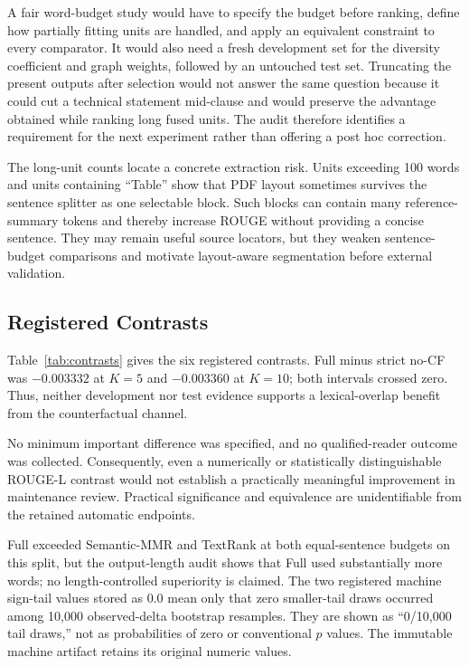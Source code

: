 \documentclass[applsci,article,submit,moreauthors]{Definitions/mdpi}
\begin{document}
A fair word-budget study would have to specify the budget before ranking, define how partially fitting units are handled, and apply an equivalent constraint to every comparator. It would also need a fresh development set for the diversity coefficient and graph weights, followed by an untouched test set. Truncating the present outputs after selection would not answer the same question because it could cut a technical statement mid-clause and would preserve the advantage obtained while ranking long fused units. The audit therefore identifies a requirement for the next experiment rather than offering a post hoc correction.

The long-unit counts locate a concrete extraction risk. Units exceeding 100 words and units containing ``Table'' show that PDF layout sometimes survives the sentence splitter as one selectable block. Such blocks can contain many reference-summary tokens and thereby increase ROUGE without providing a concise sentence. They may remain useful source locators, but they weaken sentence-budget comparisons and motivate layout-aware segmentation before external validation.

\subsection{Registered Contrasts}

Table~\ref{tab:contrasts} gives the six registered contrasts. Full minus strict no-CF was $-0.003332$ at $K=5$ and $-0.003360$ at $K=10$; both intervals crossed zero. Thus, neither development nor test evidence supports a lexical-overlap benefit from the counterfactual channel.

No minimum important difference was specified, and no qualified-reader outcome was collected. Consequently, even a numerically or statistically distinguishable ROUGE-L contrast would not establish a practically meaningful improvement in maintenance review. Practical significance and equivalence are unidentifiable from the retained automatic endpoints.

Full exceeded Semantic-MMR and TextRank at both equal-sentence budgets on this split, but the output-length audit shows that Full used substantially more words; no length-controlled superiority is claimed. The two registered machine sign-tail values stored as 0.0 mean only that zero smaller-tail draws occurred among 10,000 observed-delta bootstrap resamples. They are shown as ``0/10,000 tail draws,'' not as probabilities of zero or conventional $p$ values. The immutable machine artifact retains its original numeric values.
\end{document}

